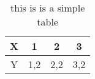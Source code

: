 \begin{table}[h!]
\centering
\begin{tabular}
{| c | c | c | c |}
\hline
 X & 1 & 2 & 3 \\ 
\hline
 Y & 1,2 & 2,2 & 3,2 \\ 
\hline
\end{tabular}
\label{SimpleTable}
\caption{this is is a simple table}
\end{table}
